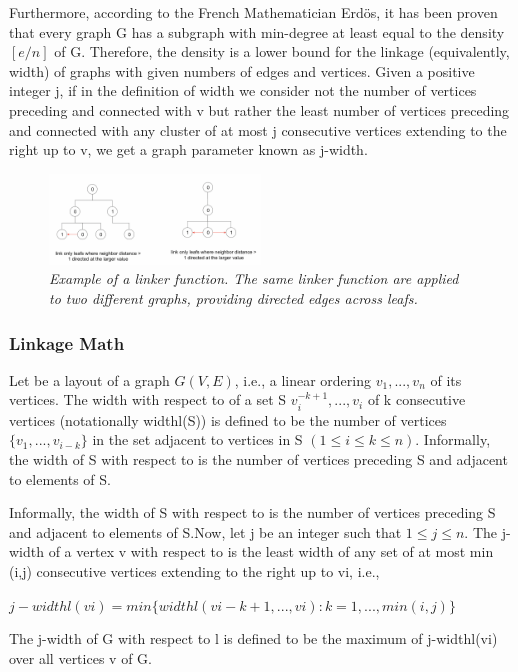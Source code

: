 Furthermore, according to the French Mathematician Erdös, it has been proven that every graph G has a subgraph with min-degree at least equal to the density $[e/n]$ of G. Therefore, the density is a lower bound for the linkage (equivalently, width) of graphs with given numbers of edges and vertices. Given a positive integer j, if in the definition of width we consider not the number of vertices preceding and connected with v but rather the least number of vertices preceding and connected with any cluster of at most j consecutive vertices extending to the right up to v, we get a graph parameter known as j-width.

\begin{figure}[H]
	\centering
        \includegraphics[width=0.5\textwidth]{images/linkage.png}
	\caption{\textit{Example of a linker function. The same linker function are applied to two different graphs, providing directed edges across leafs.}}
	\label{fig:linker}
\end{figure}

\subsubsection{Linkage Math}

Let be a layout of a graph $G (V, E)$, i.e., a linear ordering $v_{1} ,..., v_{n}$ of its vertices. The width with respect to of a set S ${v_{i}^{-k+1},...,v_{i}}$ of k consecutive vertices (notationally widthl(S)) is defined to be the number of vertices $\lbrace v_1,...,v_{i-k} \rbrace$ in the set adjacent to vertices in S $(1 \le i \le k \le n)$. Informally, the width of S with respect to is the number of vertices preceding S and adjacent to elements of S.

Informally, the width of S with respect to is the number of vertices preceding S and adjacent to elements of S.Now, let j be an integer such that $1 \le j \le n$. The j-width of a vertex v with respect to is the least width of any set of at most min (i,j) consecutive vertices extending to the right up to vi, i.e.,

$j-widthl(vi) = min \lbrace widthl(vi-k+1,...,vi):k =1,..., min(i,j)\rbrace$

The j-width of G with respect to l is defined to be the maximum of j-widthl(vi) over all vertices v of G.


